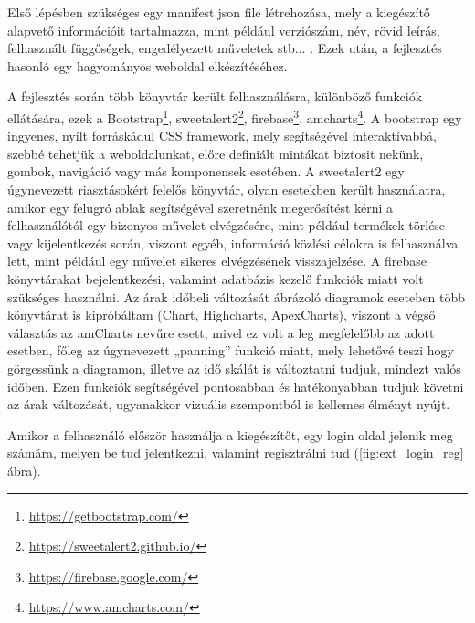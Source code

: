 Első lépésben szükséges egy manifest.json file létrehozása, mely a kiegészítő alapvető információit tartalmazza, mint például verziószám, név, rövid leírás, felhasznált függőségek, engedélyezett műveletek stb... . Ezek után, a fejlesztés hasonló egy hagyományos weboldal elkészítéséhez. 



A fejlesztés során több könyvtár került felhasználásra, különböző funkciók ellátására, ezek a Bootstrap\footnote{\url{https://getbootstrap.com/}}, sweetalert2\footnote{\url{https://sweetalert2.github.io/}}, firebase\footnote{\url{https://firebase.google.com/}}, amcharts\footnote{\url{https://www.amcharts.com/}}. A bootstrap egy ingyenes, nyílt forráskádul CSS framework, mely segítségével interaktívabbá, szebbé tehetjük a weboldalunkat, előre definiált mintákat biztosit nekünk, gombok, navigáció vagy más komponensek esetében. A sweetalert2 egy úgynevezett riasztásokért felelős könyvtár, olyan esetekben került használatra, amikor egy felugró ablak segítségével szeretnénk megerősítést kérni a felhasználótól egy bizonyos művelet elvégzésére, mint például termékek törlése vagy kijelentkezés során, viszont egyéb, információ közlési célokra is felhasználva lett, mint például egy művelet sikeres elvégzésének visszajelzése. A firebase könyvtárakat bejelentkezési, valamint adatbázis kezelő funkciók miatt volt szükséges használni. Az árak időbeli változását ábrázoló diagramok eseteben több könyvtárat is kipróbáltam (Chart, Highcharts, ApexCharts), viszont a végső választás az amCharts nevűre esett, mivel ez volt a leg megfelelőbb az adott esetben, főleg az úgynevezett „panning” funkció miatt, mely lehetővé teszi hogy görgessünk a diagramon, illetve az idő skálát is változtatni tudjuk, mindezt valós időben. Ezen funkciók segítségével pontosabban és hatékonyabban tudjuk követni az árak változását, ugyanakkor vizuális szempontból is kellemes élményt nyújt.

Amikor a felhasználó először használja a kiegészítőt, egy login oldal jelenik meg számára, melyen be tud jelentkezni, valamint regisztrálni tud (\ref{fig:ext_login_reg} ábra).

